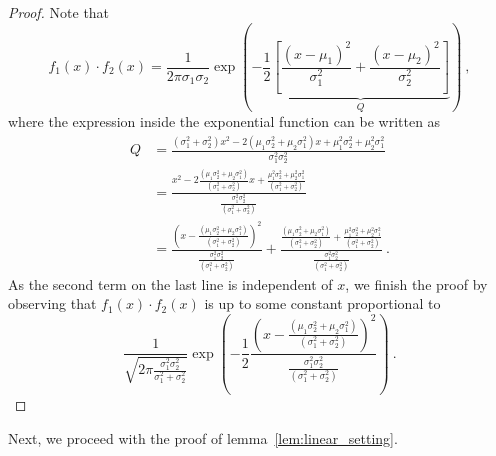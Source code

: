 \documentclass{article}
\begin{document}
\begin{proof}
    Note that 
    \begin{equation*}
        f_1(x)\cdot f_2(x) = \frac{1}{2\pi \sigma_1 \sigma_2} \exp \left( -\frac{1}{2} \underbrace{\left[\frac{(x-\mu_1)^2}{\sigma_1^2} + \frac{(x-\mu_2)^2}{\sigma_2^2} \right]}_{Q} \right)~,
    \end{equation*}
    where the expression inside the exponential function can be written as
    \begin{align*}
        Q &= \frac{\left(\sigma_1^2 + \sigma_2^2\right)x^2 - 2\left(\mu_1 \sigma_2^2 + \mu_2\sigma_1^2\right) x + \mu_1^2 \sigma_2^2 + \mu_2^2\sigma_1^2 }{\sigma_1^2\sigma_2^2} \\
        & = \frac{x^2 - 2\frac{\left(\mu_1 \sigma_2^2 + \mu_2\sigma_1^2\right)}{\left(\sigma_1^2 + \sigma_2^2\right)} x + \frac{\mu_1^2 \sigma_2^2 + \mu_2^2\sigma_1^2 }{\left(\sigma_1^2 + \sigma_2^2\right)}}{\frac{\sigma_1^2\sigma_2^2}{\left(\sigma_1^2 + \sigma_2^2\right)}} 
        \\
        &= \frac{\left(x - \frac{\left(\mu_1 \sigma_2^2 + \mu_2\sigma_1^2\right)}{\left(\sigma_1^2 + \sigma_2^2\right)}\right)^2 }{\frac{\sigma_1^2\sigma_2^2}{\left(\sigma_1^2 + \sigma_2^2\right)}} + \frac{\frac{\left(\mu_1 \sigma_2^2 + \mu_2\sigma_1^2\right)}{\left(\sigma_1^2 + \sigma_2^2\right)} + \frac{\mu_1^2 \sigma_2^2 + \mu_2^2\sigma_1^2 }{\left(\sigma_1^2 + \sigma_2^2\right)}}{\frac{\sigma_1^2\sigma_2^2}{\left(\sigma_1^2 + \sigma_2^2\right)}}~.
    \end{align*}
    As the second term on the last line is independent of $x$, we finish the proof by observing that $f_1(x)\cdot f_2(x)$ is up to some constant proportional to 
    \begin{equation*}
        \frac{1}{\sqrt{2\pi \frac{\sigma_1^2 \sigma_2^2}{\sigma_1^2 + \sigma_2^2}}}\exp\left( -\frac{1}{2} \frac{\left(x - \frac{\left(\mu_1 \sigma_2^2 + \mu_2\sigma_1^2\right)}{\left(\sigma_1^2 + \sigma_2^2\right)}\right)^2 }{\frac{\sigma_1^2\sigma_2^2}{\left(\sigma_1^2 + \sigma_2^2\right)}} \right)~.
    \end{equation*}
\end{proof}
Next, we proceed with the proof of lemma~\ref{lem:linear_setting}.
\end{document}
